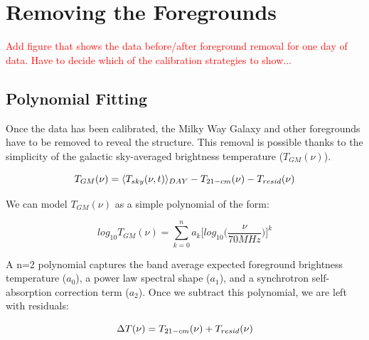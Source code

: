 \section{Removing the Foregrounds}\label{Sec:fore}

\textcolor{red}{Add figure that shows the data before/after foreground removal for one day of data. Have to decide which of the calibration strategies to show...}

\subsection{Polynomial Fitting}
Once the data has been calibrated, the Milky Way Galaxy and other foregrounds have to be removed to reveal the \cm structure. This removal is possible thanks to the simplicity of the galactic sky-averaged brightness temperature ($T_{GM}(\nu)$). 

\begin{equation}
T_{GM}(\nu) = \langle T_{sky}(\nu,t) \rangle_{DAY} - T_{21-cm} (\nu) - T_{resid} (\nu)
\end{equation}

We can model $T_{GM} (\nu)$ as a simple polynomial of the form:

\begin{equation}
log_{10} T_{GM}(\nu) = \sum_{k=0}^n a_k \Big[ log_{10} \Big(\frac{\nu}{70 MHz}\Big) \Big]^k
\end{equation}

A n=2 polynomial captures the band average expected foreground brightness temperature ($a_0$), a power law spectral shape ($a_1$), and a synchrotron self-absorption correction term ($a_2$). Once we subtract this polynomial, we are left with residuals:

\begin{equation}
\Delta T (\nu) = T_{21-cm}(\nu)+T_{resid}(\nu)
\end{equation}

